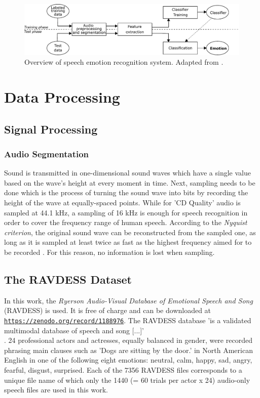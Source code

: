 \documentclass[11pt,a4paper,twoside]{article}
\theoremstyle{thmbreak}
\numberwithin{Theorem}{subsection}
\theoremstyle{defbreak}
\theoremstyle{remark}
\theoremstyle{remark}
\begin{document}
\begin{figure}[ht!]
	\centering
	\includegraphics[width=\textwidth]{EmotionRecognitionSystem.pdf}
	\caption{Overview of speech emotion recognition system. Adapted from \cite{vogt2008automatic}.}
	\label{fig:2.3 speech emotion recognition system}
\end{figure}


\section{Data Processing}

\subsection{Signal Processing}
\subsubsection{Audio Segmentation}
Sound is transmitted in one-dimensional sound waves which have a single value based on the wave's height at every moment in time.
Next, sampling needs to be done which is the process of turning the sound wave into bits by recording the height of the wave at equally-spaced points.
While for 'CD Quality' audio is sampled at  44.1 kHz, a sampling of 16 kHz is enough for speech recognition in order to cover the frequency range of human speech. 
According to the \textit{Nyquist criterion}, the original sound wave can be reconstructed from the sampled one, as long as it is sampled at least twice as fast as the highest frequency aimed for to be recorded \cite{kester2009nyquist}. For this reason, no information is lost when sampling.


\subsection{The RAVDESS Dataset}
In this work, the \textit{Ryerson Audio-Visual Database of Emotional Speech and Song} (RAVDESS) is used. It is free of charge and can be downloaded at \texttt{\url{https://zenodo.org/record/1188976}}. 
The RAVDESS database 'is a validated multimodal database of speech and song [...]' \\ \cite{livingstone2018ryerson}. 24 professional actors and actresses, equally balanced in gender, were recorded phrasing main clauses such as  'Dogs are sitting by the door.' in North American English in one of the following eight emotions: neutral, calm, happy, sad, angry, fearful, disgust, surprised. Each of the 7356 RAVDESS files corresponds to a unique file name of which only the 1440 (= 60 trials per actor x 24) audio-only speech files are used in this work.
\end{document}
